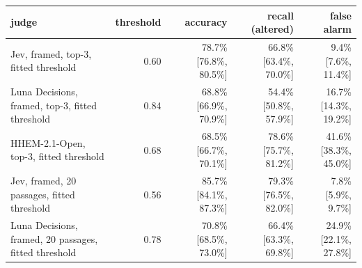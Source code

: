 \begin{tabular}{lrrrr}
\toprule
judge & threshold & accuracy & recall (altered) & false alarm \\
\midrule
Jev, framed, top-3, fitted threshold & 0.60 & 78.7\% [76.8\%, 80.5\%] & 66.8\% [63.4\%, 70.0\%] & 9.4\% [7.6\%, 11.4\%] \\
Luna Decisions, framed, top-3, fitted threshold & 0.84 & 68.8\% [66.9\%, 70.9\%] & 54.4\% [50.8\%, 57.9\%] & 16.7\% [14.3\%, 19.2\%] \\
HHEM-2.1-Open, top-3, fitted threshold & 0.68 & 68.5\% [66.7\%, 70.1\%] & 78.6\% [75.7\%, 81.2\%] & 41.6\% [38.3\%, 45.0\%] \\
Jev, framed, 20 passages, fitted threshold & 0.56 & 85.7\% [84.1\%, 87.3\%] & 79.3\% [76.5\%, 82.0\%] & 7.8\% [5.9\%, 9.7\%] \\
Luna Decisions, framed, 20 passages, fitted threshold & 0.78 & 70.8\% [68.5\%, 73.0\%] & 66.4\% [63.3\%, 69.8\%] & 24.9\% [22.1\%, 27.8\%] \\
\bottomrule
\end{tabular}
